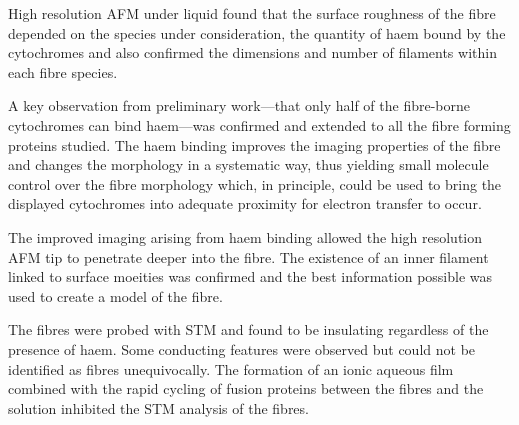 High resolution AFM under liquid found that the surface roughness of the fibre depended on the species under consideration, the quantity of haem bound by the cytochromes and also confirmed the dimensions and number of filaments within each fibre species.

A key observation from preliminary work---that only half of the fibre-borne cytochromes can bind haem---was confirmed and extended to all the fibre forming proteins studied. The haem binding improves the imaging properties of the fibre and changes the morphology in a systematic way, thus yielding small molecule control over the fibre morphology which, in principle, could be used to bring the displayed cytochromes into adequate proximity for electron transfer to occur.

The improved imaging arising from haem binding allowed the high resolution AFM tip to penetrate deeper into the fibre. The existence of an inner filament linked to surface moeities was confirmed and the best information possible was used to create a model of the fibre.

The fibres were probed with STM and found to be insulating regardless of the presence of haem. Some conducting features were observed but could not be identified as fibres unequivocally. The formation of an ionic aqueous film combined with the rapid cycling of fusion proteins between the fibres and the solution inhibited the STM analysis of the fibres. 

